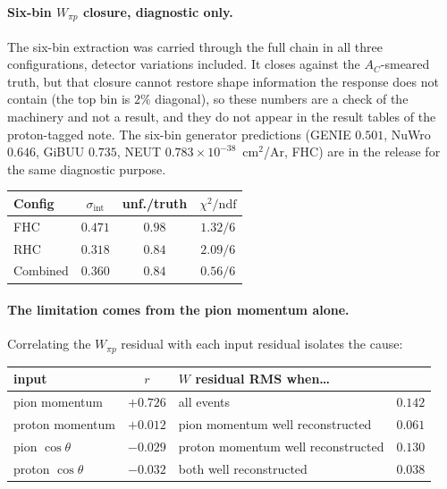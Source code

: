 \documentclass[11pt,a4paper]{article}
\begin{document}
\paragraph{Six-bin $W_{\pi p}$ closure, diagnostic only.} The six-bin extraction was
carried through the full chain in all three configurations, detector variations included.
It closes against the $A_C$-smeared truth, but that closure cannot restore shape
information the response does not contain (the top bin is $2\%$ diagonal), so these numbers
are a check of the machinery and not a result, and they do not appear in the result tables of the
proton-tagged note. The six-bin generator predictions (GENIE $0.501$, NuWro $0.646$,
GiBUU $0.735$, NEUT $0.783\times10^{-38}$~cm$^2$/Ar, FHC) are in the release for the same
diagnostic purpose.

\begin{center}\small
{}
\label{tab:wpipr_sixbin_closure}
\begin{tabular}{lccc}
\toprule
Config & $\sigma_\mathrm{int}$ & unf./truth & $\chi^2/\mathrm{ndf}$ \\
\midrule
FHC      & $0.471$ & $0.98$ & $1.32/6$ \\
RHC      & $0.318$ & $0.84$ & $2.09/6$ \\
Combined & $0.360$ & $0.84$ & $0.56/6$ \\
\bottomrule
\end{tabular}
\end{center}

\paragraph{The limitation comes from the pion momentum alone.} Correlating the $W_{\pi p}$
residual with each input residual isolates the cause:

\begin{center}\small
\begin{tabular}{lc|lc}
\toprule
input & $r$ & $W$ residual RMS when\ldots & \\\midrule
pion momentum   & $\mathbf{+0.726}$ & all events                 & $0.142$ \\
proton momentum & $+0.012$ & pion momentum well reconstructed    & $\mathbf{0.061}$ \\
pion $\cos\theta$   & $-0.029$ & proton momentum well reconstructed  & $0.130$ \\
proton $\cos\theta$ & $-0.032$ & both well reconstructed             & $0.038$ \\
\bottomrule
\end{tabular}
\end{center}
\end{document}
